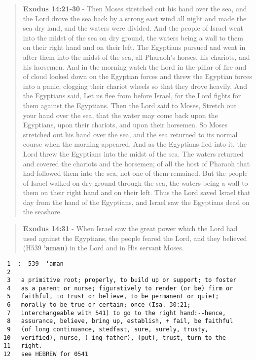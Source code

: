 \documentclass[11pt]{article}
\begin{document}
\begin{quote}
\textbf{Exodus 14:21-30} - Then Moses stretched out his hand over the sea, and the Lord drove the sea back by a strong east wind all night and made the sea dry land, and the waters were divided. And the people of Israel went into the midst of the sea on dry ground, the waters being a wall to them on their right hand and on their left. The Egyptians pursued and went in after them into the midst of the sea, all Pharaoh's horses, his chariots, and his horsemen. And in the morning watch the Lord in the pillar of fire and of cloud looked down on the Egyptian forces and threw the Egyptian forces into a panic, clogging their chariot wheels so that they drove heavily. And the Egyptians said, Let us flee from before Israel, for the Lord fights for them against the Egyptians. Then the Lord said to Moses, Stretch out your hand over the sea, that the water may come back upon the Egyptians, upon their chariots, and upon their horsemen. So Moses stretched out his hand over the sea, and the sea returned to its normal course when the morning appeared. And as the Egyptians fled into it, the Lord threw the Egyptians into the midst of the sea. The waters returned and covered the chariots and the horsemen; of all the host of Pharaoh that had followed them into the sea, not one of them remained. But the people of Israel walked on dry ground through the sea, the waters being a wall to them on their right hand and on their left. Thus the Lord saved Israel that day from the hand of the Egyptians, and Israel saw the Egyptians dead on the seashore.
\end{quote}

\begin{quote}
\textbf{Exodus 14:31} - When Israel saw the great power which the Lord had used against the Egyptians, the people feared the Lord, and they believed (H539 \textbf{'aman}) in the Lord and in His servant Moses.
\end{quote}

\begin{verbatim}
 1  :  539  'aman
 2  
 3   a primitive root; properly, to build up or support; to foster
 4   as a parent or nurse; figuratively to render (or be) firm or
 5   faithful, to trust or believe, to be permanent or quiet;
 6   morally to be true or certain; once (Isa. 30:21;
 7   interchangeable with 541) to go to the right hand:--hence,
 8   assurance, believe, bring up, establish, + fail, be faithful
 9   (of long continuance, stedfast, sure, surely, trusty,
10   verified), nurse, (-ing father), (put), trust, turn to the
11   right.
12   see HEBREW for 0541
\end{verbatim}
\end{document}
